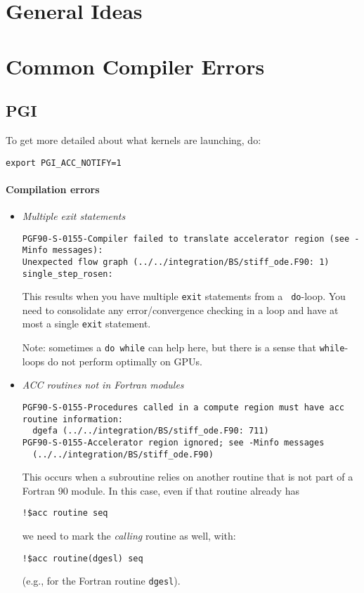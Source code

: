 \section{General Ideas}



\section{Common Compiler Errors}

\subsection{PGI}

To get more detailed about what kernels are launching, do:
\begin{verbatim}
export PGI_ACC_NOTIFY=1
\end{verbatim}

\paragraph{Compilation errors}

\begin{itemize}

\item {\em Multiple exit statements}

\begin{verbatim}
PGF90-S-0155-Compiler failed to translate accelerator region (see -Minfo messages): 
Unexpected flow graph (../../integration/BS/stiff_ode.F90: 1)
single_step_rosen:
\end{verbatim}
This results when you have multiple {\tt exit} statements from a {\tt
  do}-loop.  You need to consolidate any error/convergence checking in
a loop and have at most a single {\tt exit} statement.

Note: sometimes a {\tt do while} can help here, but there is a sense
that {\tt while}-loops do not perform optimally on GPUs.

\item {\em ACC routines not in Fortran modules}

\begin{verbatim}
PGF90-S-0155-Procedures called in a compute region must have acc routine information: 
  dgefa (../../integration/BS/stiff_ode.F90: 711)
PGF90-S-0155-Accelerator region ignored; see -Minfo messages  
  (../../integration/BS/stiff_ode.F90)
\end{verbatim}

This occurs when a subroutine relies on another routine that is not part
of a Fortran 90 module.  In this case, even if that routine already has
\begin{verbatim}
!$acc routine seq
\end{verbatim}
we need to mark the {\em calling} routine as well, with:
\begin{verbatim}
!$acc routine(dgesl) seq
\end{verbatim}
(e.g., for the Fortran routine {\tt dgesl}).
\end{itemize}



